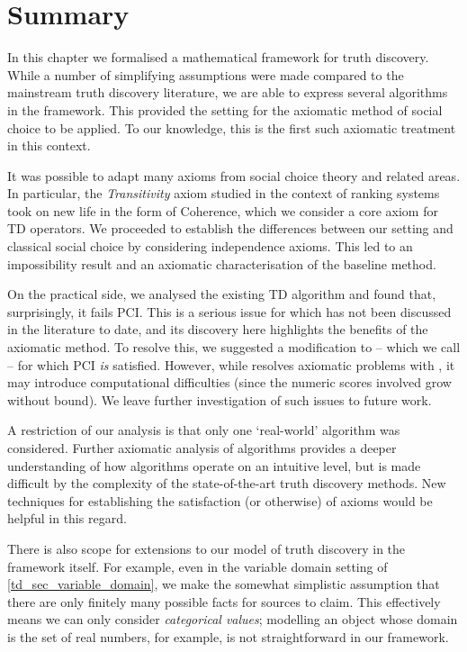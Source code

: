 \section{Summary}
\label{td_sec_conclusion}

In this chapter we formalised a mathematical framework for truth discovery. While
a number of simplifying assumptions were made compared to the mainstream truth
discovery literature, we are able to express several algorithms in the
framework. This provided the setting for the axiomatic method of social choice
to be applied. To our knowledge, this is the first such axiomatic treatment in
this context.

It was possible to adapt many axioms from social choice theory and related
areas. In particular, the \emph{Transitivity} axiom studied in the context of
ranking systems~\cite{tennenholtz2004,altman2008} took on new life in the form
of Coherence, which we consider a core axiom for TD operators.
We proceeded to establish the differences between our setting and classical
social choice by considering independence axioms. This led to an impossibility
result and an axiomatic characterisation of the baseline \voting{} method.

On the practical side, we analysed the existing TD algorithm \sums{} and found
that, surprisingly, it fails PCI. This is a serious issue for \sums{} which has
not been discussed in the literature to date, and its discovery here highlights
the benefits of the axiomatic method. To resolve this, we suggested a
modification to \sums{} -- which we call \usums{} -- for which PCI \emph{is}
satisfied. However, while \usums{} resolves axiomatic problems with \sums{}, it
may introduce computational difficulties (since the numeric scores involved
grow without bound). We leave further investigation of such issues to future
work.

A restriction of our analysis is that only one `real-world' algorithm was
considered. Further axiomatic analysis of algorithms provides a deeper
understanding of how algorithms operate on an intuitive level, but is made
difficult by the complexity of the state-of-the-art truth discovery methods.
New techniques for establishing the satisfaction (or otherwise) of axioms would
be helpful in this regard.

There is also scope for extensions to our model of truth discovery in the
framework itself. For example, even in the variable domain setting of
\cref{td_sec_variable_domain}, we make the somewhat simplistic assumption that
there are only finitely many possible facts for sources to claim. This
effectively means we can only consider \emph{categorical values}; modelling an
object whose domain is the set of real numbers, for example, is not
straightforward in our framework.

